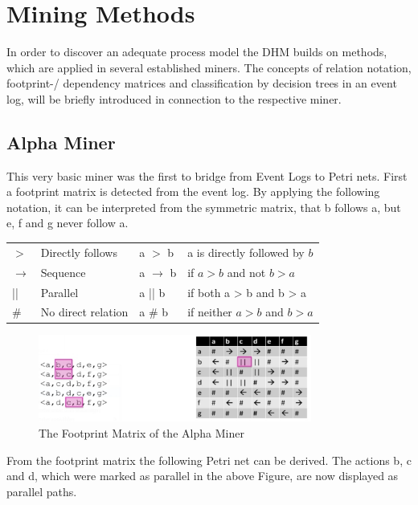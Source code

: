 
\section{Mining Methods}
In order to discover an adequate process model the DHM builds on methods, which are applied in several established miners. The concepts of relation notation, footprint-/ dependency matrices and classification by decision trees in an event log, will be briefly introduced in connection to the respective miner.  

\subsection{Alpha Miner}
This very basic miner was the first to bridge from Event Logs to Petri nets. First a footprint matrix is detected from the event log. By applying the following notation, it can be interpreted from the symmetric matrix, that b follows a, but e, f and g never follow a.\\

\begin{tabular}[width=13cm]{llll}
$>$ & Directly follows &a $>$ b& a is directly followed by $b$ \\
$\rightarrow$ & Sequence & a $\rightarrow$ b & if $a>b$ and not $b>a$ \\
|| & Parallel & a || b & if both a > b and b > a \\
$\#$ & No direct relation & a $\#$ b & if neither $a>b$ and $b>a$ \\
\end{tabular}


\begin{figure}[H]
\begin{center}
\includegraphics[width=0.8\textwidth]{Chapters/Graphics_Paper/AlphaMiner_DependenceMatrix.jpg}
\caption{The Footprint Matrix of the Alpha Miner\protect\cite{Buijs2017}} 
\end{center}
\end{figure}

\noindent From the footprint matrix the following Petri net can be derived. The actions b, c and d, which were marked as parallel in the above Figure, are now displayed as parallel paths.\protect\cite{Buijs2017}


